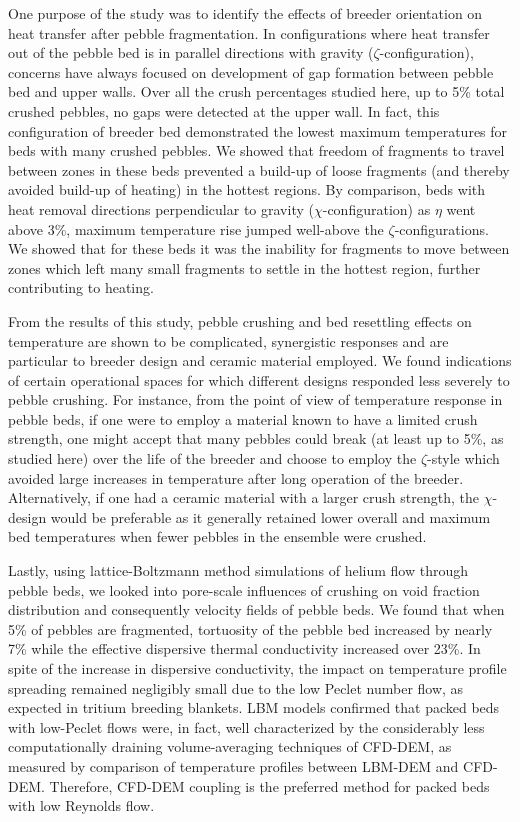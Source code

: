One purpose of the study was to identify the effects of breeder orientation on heat transfer after pebble fragmentation. In configurations where heat transfer out of the pebble bed is in parallel directions with gravity ($\zeta$-configuration), concerns have always focused on development of gap formation between pebble bed and upper walls. Over all the crush percentages studied here, up to 5\% total crushed pebbles, no gaps were detected at the upper wall. In fact, this configuration of breeder bed demonstrated the lowest maximum temperatures for beds with many crushed pebbles. We showed that freedom of fragments to travel between zones in these beds prevented a build-up of loose fragments (and thereby avoided build-up of heating) in the hottest regions. By comparison, beds with heat removal directions perpendicular to gravity ($\chi$-configuration) as $\eta$ went above 3\%, maximum temperature rise jumped well-above the $\zeta$-configurations. We showed that for these beds it was the inability for fragments to move between zones which left many small fragments to settle in the hottest region, further contributing to heating.

From the results of this study, pebble crushing and bed resettling effects on temperature are shown to be complicated, synergistic responses and are particular to breeder design and ceramic material employed. We found indications of certain operational spaces for which different designs responded less severely to pebble crushing. For instance, from the point of view of temperature response in pebble beds, if one were to employ a material known to have a limited crush strength, one might accept that many pebbles could break (at least up to 5\%, as studied here) over the life of the breeder and choose to employ the $\zeta$-style which avoided large increases in temperature after long operation of the breeder. Alternatively, if one had a ceramic material with a larger crush strength, the $\chi$-design would be preferable as it generally retained lower overall and maximum bed temperatures when fewer pebbles in the ensemble were crushed.


Lastly, using lattice-Boltzmann method simulations of helium flow through pebble beds, we looked into pore-scale influences of crushing on void fraction distribution and consequently velocity fields of pebble beds. We found that when 5\% of pebbles are fragmented, tortuosity of the pebble bed increased by nearly 7\% while the effective dispersive thermal conductivity increased over 23\%. In spite of the increase in dispersive conductivity, the impact on temperature profile spreading remained negligibly small due to the low Peclet number flow, as expected in tritium breeding blankets. LBM models confirmed that packed beds with low-Peclet flows were, in fact, well characterized by the considerably less computationally draining volume-averaging techniques of CFD-DEM, as measured by comparison of temperature profiles between LBM-DEM and CFD-DEM. Therefore, CFD-DEM coupling is the preferred method for packed beds with low Reynolds flow.

